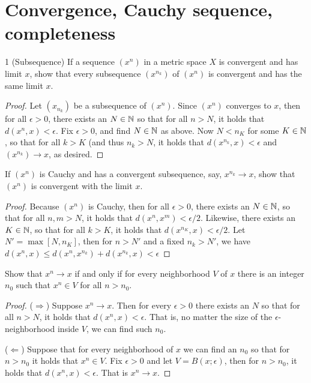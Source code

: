 \section{Convergence, Cauchy sequence, completeness}

\begin{exercise}{1 (Subsequence)}
If a sequence $(x^n)$ in a metric space $X$ is convergent and has limit $x$, show that every subsequence $(x^{n_k})$ of $(x^n)$ is convergent and has the same limit $x$.
\end{exercise}
\begin{proof}
Let $(x_{n_k})$ be a subsequence of $(x^n)$. Since $(x^n)$ converges to $x$, then for all $\epsilon>0$, there exists an $N\in\mathbb{N}$ so that for all $n>N$, it holds that $d(x^n,x)<\epsilon$. Fix $\epsilon>0$, and find $N\in\mathbb{N}$ as above. Now $N<n_K$ for some $K\in\mathbb{N}$, so that for all $k>K$ (and thus $n_k>N$, it holds that $d(x^{n_k},x)<\epsilon$ and $(x^{n_k})\to x$, as desired.
\end{proof}

\begin{exercise}{2}
If $(x^n)$ is Cauchy and has a convergent subsequence, say, $x^{n_k}\to x$, show that $(x^n)$ is convergent with the limit $x$.
\end{exercise}
\begin{proof}
Because $(x^n)$ is Cauchy, then for all $\epsilon>0$, there exists an $N\in\mathbb{N}$, so that for all $n,m>N$, it holds that $d(x^n,x^m)<\epsilon/2$. Likewise, there exists an $K\in\mathbb{N}$, so that for all $k>K$, it holds that $d(x^{n_K},x)<\epsilon/2$. Let $N'=\max[N,n_K]$, then for $n>N'$ and a fixed $n_k>N'$, we have $d(x^n,x)\leq d(x^n,x^{n_k})+d(x^{n_k},x)<\epsilon$
\end{proof}

\begin{exercise}{3}
Show that $x^n\to x$ if and only if for every neighborhood $V$ of $x$ there is an integer $n_0$ such that $x^n\in V$ for all $n>n_0$.
\end{exercise}
\begin{proof}
($\Rightarrow$) Suppose $x^n\to x$. Then for every $\epsilon>0$ there exists an $N$ so that for all $n>N$, it holds that $d(x^n,x)<\epsilon$. That is, no matter the size of the $\epsilon$-neighborhood inside $V$, we can find such $n_0$.

($\Leftarrow$) Suppose that for every neighborhood of $x$ we can find an $n_0$ so that for $n>n_0$ it holds that $x^n\in V$. Fix $\epsilon>0$ and let $V=B(x;\epsilon)$, then for $n>n_0$, it holds that $d(x^n,x)<\epsilon$. That is $x^n\to x$.
\end{proof}

